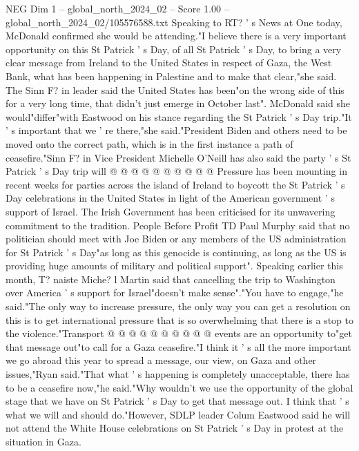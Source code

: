 \begin{textsample}{NEG Dim 1 – global\_north\_2024\_02 – Score 1.00 – global\_north\_2024\_02/105576588.txt}  \label{ex:f1_neg_179}
Speaking to RT? ' s News at One today, McDonald confirmed she would be attending."I believe there is a very important opportunity on this St Patrick ' s Day, of all St Patrick ' s Day, to bring a very clear message from Ireland to the United States in respect of Gaza, the West Bank, what has been happening in Palestine and to make that clear,"she said.
The Sinn F? in leader said the United States has been"on the wrong side of this for a very long time, that didn't just emerge in October last".
McDonald said she would"differ"with Eastwood on his stance regarding the St Patrick ' s Day trip."It ' s important that we ' re there,"she said."President Biden and others need to be moved onto the correct path, which is in the first instance a path of ceasefire."Sinn F? in Vice President Michelle O'Neill has also said the party ' s St Patrick ' s Day trip will @ @ @ @ @ @ @ @ @ @ Pressure has been mounting in recent weeks for parties across the island of Ireland to boycott the St Patrick ' s Day celebrations in the United States in light of the American government ' s support of Israel.
The Irish Government has been criticised for its unwavering commitment to the tradition.
People Before Profit TD Paul Murphy said that no politician should meet with Joe Biden or any members of the US administration for St Patrick ' s Day"as long as this genocide is continuing, as long as the US is providing huge amounts of military and political support".
Speaking earlier this month, T? naiste Miche? l Martin said that cancelling the trip to Washington over America ' s support for Israel"doesn't make sense"."You have to engage,"he said."The only way to increase pressure, the only way you can get a resolution on this is to get international pressure that is so overwhelming that there is a stop to the violence."Transport @ @ @ @ @ @ @ @ @ @ events are an opportunity to"get that message out"to call for a Gaza ceasefire."I think it ' s all the more important we go abroad this year to spread a message, our view, on Gaza and other issues,"Ryan said."That what ' s happening is completely unacceptable, there has to be a ceasefire now,"he said."Why wouldn't we use the opportunity of the global stage that we have on St Patrick ' s Day to get that message out.
I think that ' s what we will and should do."However, SDLP leader Colum Eastwood said he will not attend the White House celebrations on St Patrick ' s Day in protest at the situation in Gaza.

\end{textsample}
